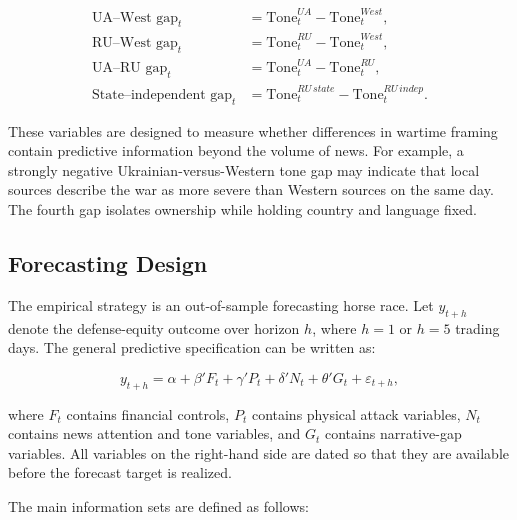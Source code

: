 \documentclass[12pt,a4paper]{article}
\begin{document}
\begin{align}
\text{UA--West gap}_{t} &= \text{Tone}^{UA}_{t} - \text{Tone}^{West}_{t}, \\
\text{RU--West gap}_{t} &= \text{Tone}^{RU}_{t} - \text{Tone}^{West}_{t}, \\
\text{UA--RU gap}_{t} &= \text{Tone}^{UA}_{t} - \text{Tone}^{RU}_{t}, \\
\text{State--independent gap}_{t} &= \text{Tone}^{RU\,state}_{t} - \text{Tone}^{RU\,indep}_{t}.
\end{align}

These variables are designed to measure whether differences in wartime framing contain predictive information beyond the volume of news. For example, a strongly negative Ukrainian-versus-Western tone gap may indicate that local sources describe the war as more severe than Western sources on the same day. The fourth gap isolates ownership while holding country and language fixed.

\subsection{Forecasting Design}

The empirical strategy is an out-of-sample forecasting horse race. Let $y_{t+h}$ denote the defense-equity outcome over horizon $h$, where $h=1$ or $h=5$ trading days. The general predictive specification can be written as:

\begin{equation}
y_{t+h} = \alpha + \beta'F_t + \gamma'P_t + \delta'N_t + \theta'G_t + \varepsilon_{t+h},
\end{equation}

where $F_t$ contains financial controls, $P_t$ contains physical attack variables, $N_t$ contains news attention and tone variables, and $G_t$ contains narrative-gap variables. All variables on the right-hand side are dated so that they are available before the forecast target is realized.

The main information sets are defined as follows:
\end{document}
